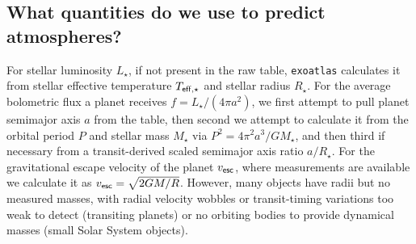 \documentclass[modern,linenumbers,trackchanges]{aastex7}
\begin{document}
\subsection{What quantities do we use to predict atmospheres?}

For stellar luminosity $L_\star$, if not present in the raw table, \texttt{exoatlas} calculates it from stellar effective temperature $T_{\sf eff, \star}$ and stellar radius $R_\star$. For the average bolometric flux a planet receives $f = L_\star/(4\pi a^2)$, we first attempt to pull planet semimajor axis $a$ from the table, then second we attempt to calculate it from the orbital period $P$ and stellar mass $M_\star$ via $P^2 = 4\pi^2 a^3/GM_\star$, and then third if necessary from a transit-derived scaled semimajor axis ratio $a/R_\star$. For the gravitational escape velocity of the planet $v_{\sf esc}$, where measurements are available we calculate it as $v_{\sf esc} = \sqrt{2GM / R}$. However, many objects have radii but no measured masses, with radial velocity wobbles or transit-timing variations too weak to detect (transiting planets) or no orbiting bodies to provide dynamical masses (small Solar System objects). 
\end{document}
